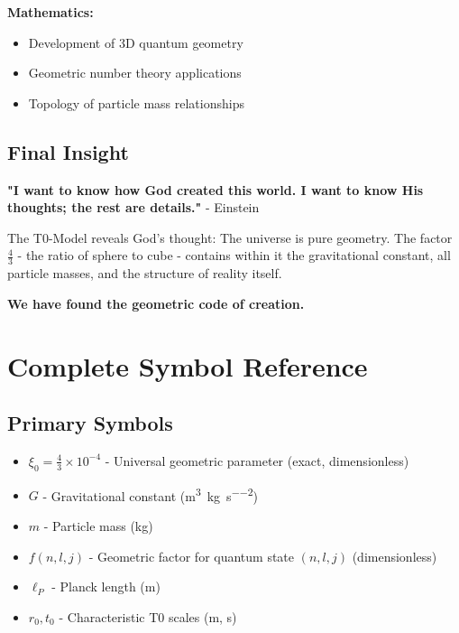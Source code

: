 \documentclass[12pt,a4paper]{article}
\newcommand{\xifunc}{f(n,l,j)}
\theoremstyle{definition}
\begin{document}
	\textbf{Mathematics:}
	\begin{itemize}
		\item Development of 3D quantum geometry
		\item Geometric number theory applications
		\item Topology of particle mass relationships
	\end{itemize}
	
	\subsection{Final Insight}
	
	\begin{important}
		\textbf{"I want to know how God created this world. I want to know His thoughts; the rest are details."} - Einstein
		
		The T0-Model reveals God's thought: The universe is pure geometry. The factor $\frac{4}{3}$ - the ratio of sphere to cube - contains within it the gravitational constant, all particle masses, and the structure of reality itself.
		
		\textbf{We have found the geometric code of creation.}
	\end{important}
	
	\section{Complete Symbol Reference}
	
	\subsection{Primary Symbols}
	\begin{itemize}
		\item $\xi_0 = \frac{4}{3} \times 10^{-4}$ - Universal geometric parameter (exact, dimensionless)
		\item $G$ - Gravitational constant (\si{\metre\cubed\per\kilogram\per\second\squared})
		\item $m$ - Particle mass (\si{\kilogram})
		\item $\xifunc$ - Geometric factor for quantum state $(n,l,j)$ (dimensionless)
		\item $\ell_P$ - Planck length (\si{\metre})
		\item $r_0, t_0$ - Characteristic T0 scales (\si{\metre}, \si{\second})
	\end{itemize}
	
\end{document}
